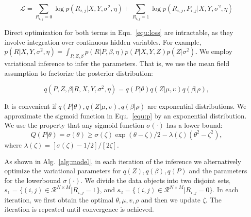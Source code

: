 \documentclass[sigconf,anonymous]{acmart}
\begin{document}
\begin{equation}\label{equ:loss}
\mathcal{L}=\sum_{R_{i,j}=0} \log p(R_{i,j}|X,Y,\sigma^2,\eta) + \sum_{R_{i,j}=1} \log p(R_{i,j},P_{i,j}|X,Y,\sigma^2,\eta)
\end{equation}


Direct optimization for both terms in Equ.~\ref{equ:loss} are intractable, as they involve integration over continuous hidden variables. For example, $p(R|X,Y,\sigma^2,\eta)=\int_{P,Z,\beta} p(R|P,\beta,\eta) p(P|X,Y,Z) p(Z|\sigma^2) $. We employ variational inference to infer the parameters. That is, we use the mean field assumption to factorize the posterior distribution: 

\begin{equation}
    q(P,Z,\beta|R,X,Y,\sigma^{2},\eta) = q(P|\theta)q(Z|\mu,\upsilon)q(\beta|\rho),
\end{equation}

It is convenient if $q(P|\theta),q(Z|\mu,\upsilon),q(\beta|\rho)$ are exponential distributions. We approximate the sigmoid function in Equ.~\ref{equ:p} by an exponential distribution. We use the property that any sigmoid function $\sigma(\cdot)$ has a lower bound:
\begin{equation}
Q(P|\theta)=\sigma(\theta)\geq \sigma(\zeta)\exp{(\theta-\zeta)/2-\lambda(\zeta)(\theta^2-\zeta^2)},
\end{equation}
where $\lambda(\zeta)=[\sigma(\zeta)-1/2]/[2\zeta]$.

As shown in Alg.~\ref{alg:model}, in each iteration of the inference we alternatively optimize the variational parameters for $q(Z),q(\beta), q(P)$ and the parameters for the lowerbound $\sigma(\cdot)$. We divide the data objects into two disjoint sets, $s_1 = \{(i,j)\in \mathcal{R}^{N\times M}|R_{i,j}=1\}$, and $s_2= \{(i,j)\in \mathcal{R}^{N\times M}|R_{i,j}=0\}$. In each iteration, we first obtain the optimal $\theta,\mu,v,\rho$ and then we update $\zeta$. The iteration is repeated until convergence is achieved.
\end{document}
